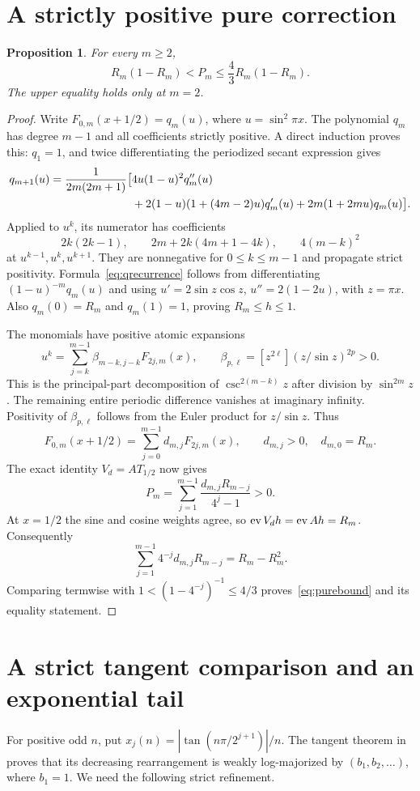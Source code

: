 \documentclass[11pt,a4paper]{article}
\newtheorem{proposition}[theorem]{Proposition}\newtheorem{corollary}[theorem]{Corollary}
\theoremstyle{remark}\newtheorem*{ednote}{Editorial note (ProveIt, 2026-10-01)}
\begin{document}
\section{A strictly positive pure correction}
\begin{proposition}\label{prop:pure}
For every $m\ge2$,
\begin{equation}\label{eq:purebound}
 R_m(1-R_m)<P_m\le\frac43R_m(1-R_m).
\end{equation}
The upper equality holds only at $m=2$.
\end{proposition}
\begin{proof}
Write $F_{0,m}(x+1/2)=q_m(u)$, where $u=\sin^2\pi x$. The polynomial $q_m$ has degree $m-1$ and all coefficients strictly positive. A direct induction proves this: $q_1=1$, and twice differentiating the periodized secant expression gives
\begin{align}\label{eq:qrecurrence}
 q_{m+1}(u)=\frac1{2m(2m+1)}\bigl[&4u(1-u)^2q_m''(u)\notag\\
 &+2(1-u)(1+(4m-2)u)q_m'(u)
 +2m(1+2mu)q_m(u)\bigr].
\end{align}
Applied to $u^k$, its numerator has coefficients
\[
 2k(2k-1),\qquad 2m+2k(4m+1-4k),\qquad4(m-k)^2
\]
at $u^{k-1},u^k,u^{k+1}$. They are nonnegative for $0\le k\le m-1$ and propagate strict positivity. Formula~\eqref{eq:qrecurrence} follows from differentiating $(1-u)^{-m}q_m(u)$ and using $u'=2\sin z\cos z$, $u''=2(1-2u)$, with $z=\pi x$. Also $q_m(0)=R_m$ and $q_m(1)=1$, proving $R_m\le h\le1$.

The monomials have positive atomic expansions
\[
 u^k=\sum_{j=k}^{m-1}\beta_{m-k,j-k}F_{2j,m}(x),\qquad
 \beta_{p,\ell}=[z^{2\ell}](z/\sin z)^{2p}>0.
\]
This is the principal-part decomposition of $\csc^{2(m-k)}z$ after division by $\sin^{2m}z$. The remaining entire periodic difference vanishes at imaginary infinity. Positivity of $\beta_{p,\ell}$ follows from the Euler product for $z/\sin z$.
Thus
\[
 F_{0,m}(x+1/2)=\sum_{j=0}^{m-1}d_{m,j}F_{2j,m}(x),
 \qquad d_{m,j}>0,\quad d_{m,0}=R_m.
\]
The exact identity $V_d=AT_{1/2}$ now gives
\[
 P_m=\sum_{j=1}^{m-1}\frac{d_{m,j}R_{m-j}}{4^j-1}>0.
\]
At $x=1/2$ the sine and cosine weights agree, so $\operatorname{ev} V_dh=\operatorname{ev} Ah=R_m$. Consequently
\[
 \sum_{j=1}^{m-1}4^{-j}d_{m,j}R_{m-j}=R_m-R_m^2.
\]
Comparing termwise with $1<(1-4^{-j})^{-1}\le4/3$ proves~\eqref{eq:purebound} and its equality statement.
\end{proof}

\section{A strict tangent comparison and an exponential tail}
For positive odd $n$, put $x_j(n)=|\tan(n\pi/2^{j+1})|/n$. The tangent theorem in \cite{triangle} proves that its decreasing rearrangement is weakly log-majorized by $(b_1,b_2,\ldots)$, where $b_1=1$. We need the following strict refinement.
\end{document}

